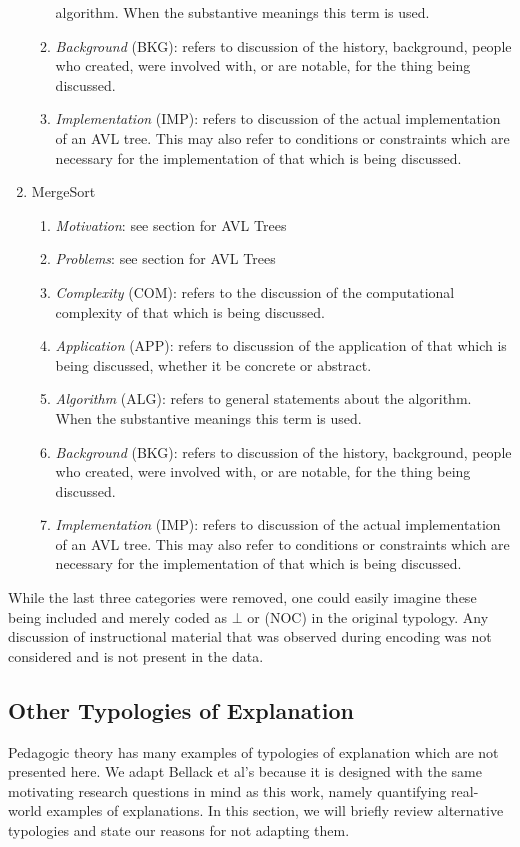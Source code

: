\documentclass[conference]{IEEEtran}
\begin{document}
\begin{enumerate}
\begin{enumerate}
        algorithm. When the 
        substantive meanings this term is used.
      \item \emph{Background} (BKG): refers to discussion of the history,
        background, people who created, were involved with, or are notable,
        for the thing being discussed.
      \item \emph{Implementation} (IMP): refers to discussion of the actual
        implementation of an AVL tree. This may also refer to conditions or
        constraints which are necessary for the implementation of that which
        is being discussed.
    \end{enumerate}
  \item{MergeSort}
    \begin{enumerate}
      \item \emph{Motivation}: see section for AVL Trees
      \item \emph{Problems}: see section for AVL Trees
      \item \emph{Complexity} (COM): refers to the discussion of the computational
        complexity of that which is being discussed. 
      \item \emph{Application} (APP): refers to discussion of the application of
        that which is being discussed, whether it be concrete or abstract.
      \item \emph{Algorithm} (ALG): refers to general statements about the
        algorithm. When the 
        substantive meanings this term is used.
      \item \emph{Background} (BKG): refers to discussion of the history,
        background, people who created, were involved with, or are notable,
        for the thing being discussed.
      \item \emph{Implementation} (IMP): refers to discussion of the actual
        implementation of an AVL tree. This may also refer to conditions or
        constraints which are necessary for the implementation of that which
        is being discussed.
    \end{enumerate}
  \end{enumerate}

While the last three categories were removed, one could easily
imagine these being included and merely coded as $\bot$ or (NOC) in the original
typology. Any discussion of instructional material that was observed during
encoding was not considered and is not present in the data.

\subsection{Other Typologies of Explanation}
Pedagogic theory has many examples of typologies of explanation which are not
presented here. We adapt Bellack et al's because it is designed with the same
motivating research questions in mind as this work, namely quantifying
real-world examples of explanations. In this section, we will briefly review
alternative typologies and state our reasons for not adapting them. 
\end{document}
